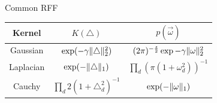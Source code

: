 \documentclass[10pt]{../formats/RU}
\begin{document}
\begin{frame}{Common RFF}
  \centering
  \begin{tabular}{c c c}
    Kernel & $K(\triangle)$ & $p(\vec{\omega})$ \\
    \hline
    Gaussian & $\exp(-\gamma\lVert\triangle\rVert_2^2)$ & $(2\pi)^{-\frac{s}{2}}\exp{-\gamma\lVert\mathbf{\omega}\rVert_2^2}$\\
    Laplacian & $\exp(-\lVert\triangle\rVert_1)$ & $\prod\limits_{d}(\pi(1+\omega_d^2))^{-1}$\\
    Cauchy & $\prod\limits_{d}2(1+\triangle_d^2)^{-1}$ & $\exp(-\lVert\mathbf{\omega}\rVert_1)$
  \end{tabular}
\end{frame}
\end{document}
